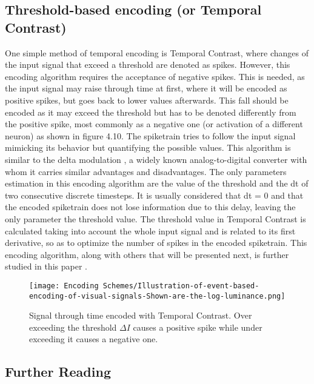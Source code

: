 \documentclass[12pt]{report}
\begin{document}
\subsection{Threshold-based encoding (or Temporal Contrast)}

One simple method of temporal encoding is Temporal Contrast, where changes of the input signal that exceed a threshold are denoted as spikes. However, this encoding algorithm requires the acceptance of negative spikes. This is needed, as the input signal may raise through time at first, where it will be encoded as positive spikes, but goes back to lower values afterwards. This fall should be encoded as it may exceed the threshold but has to be denoted differently from the positive spike, most commonly as a negative one (or activation of a different neuron) as shown in figure 4.10. The spiketrain tries to follow the input signal mimicking its behavior but quantifying the possible values. This algorithm is similar to the delta modulation \cite{Schindler1970}, a widely known analog-to-digital converter with whom it carries similar advantages and disadvantages. The only parameters estimation in this encoding algorithm are the value of the threshold and the dt of two consecutive discrete timesteps. It is usually considered that dt = 0 and that the encoded spiketrain does not lose information due to this delay, leaving the only parameter the threshold value. The threshold value in Temporal Contrast is calculated taking into account the whole input signal and is related to its first derivative, so as to optimize the number of spikes in the encoded spiketrain. This encoding algorithm, along with others that will be presented next, is further studied in this paper \cite{Petro2020}.

\begin{figure}[htp]
    \centering
    \texttt{[image: Encoding Schemes/Illustration-of-event-based-encoding-of-visual-signals-Shown-are-the-log-luminance.png]}
    \caption{Signal through time encoded with Temporal Contrast. Over exceeding the threshold \(\Delta I\) causes a positive spike while under exceeding it causes a negative one.}
    \label{fig:spikeprop-net-architecture}
\end{figure}

\subsection{Further Reading}
\end{document}
